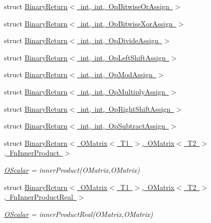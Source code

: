 \begin{DoxyCompactItemize}
\item 
struct \mbox{\hyperlink{structENSEM_1_1BinaryReturn_3_01int_00_01int_00_01OpBitwiseOrAssign_01_4}{Binary\+Return$<$ int, int, Op\+Bitwise\+Or\+Assign $>$}}
\item 
struct \mbox{\hyperlink{structENSEM_1_1BinaryReturn_3_01int_00_01int_00_01OpBitwiseXorAssign_01_4}{Binary\+Return$<$ int, int, Op\+Bitwise\+Xor\+Assign $>$}}
\item 
struct \mbox{\hyperlink{structENSEM_1_1BinaryReturn_3_01int_00_01int_00_01OpDivideAssign_01_4}{Binary\+Return$<$ int, int, Op\+Divide\+Assign $>$}}
\item 
struct \mbox{\hyperlink{structENSEM_1_1BinaryReturn_3_01int_00_01int_00_01OpLeftShiftAssign_01_4}{Binary\+Return$<$ int, int, Op\+Left\+Shift\+Assign $>$}}
\item 
struct \mbox{\hyperlink{structENSEM_1_1BinaryReturn_3_01int_00_01int_00_01OpModAssign_01_4}{Binary\+Return$<$ int, int, Op\+Mod\+Assign $>$}}
\item 
struct \mbox{\hyperlink{structENSEM_1_1BinaryReturn_3_01int_00_01int_00_01OpMultiplyAssign_01_4}{Binary\+Return$<$ int, int, Op\+Multiply\+Assign $>$}}
\item 
struct \mbox{\hyperlink{structENSEM_1_1BinaryReturn_3_01int_00_01int_00_01OpRightShiftAssign_01_4}{Binary\+Return$<$ int, int, Op\+Right\+Shift\+Assign $>$}}
\item 
struct \mbox{\hyperlink{structENSEM_1_1BinaryReturn_3_01int_00_01int_00_01OpSubtractAssign_01_4}{Binary\+Return$<$ int, int, Op\+Subtract\+Assign $>$}}
\item 
struct \mbox{\hyperlink{structENSEM_1_1BinaryReturn_3_01OMatrix_3_01T1_01_4_00_01OMatrix_3_01T2_01_4_00_01FnInnerProduct_01_4}{Binary\+Return$<$ O\+Matrix$<$ T1 $>$, O\+Matrix$<$ T2 $>$, Fn\+Inner\+Product $>$}}
\begin{DoxyCompactList}\small\item\em \mbox{\hyperlink{classENSEM_1_1OScalar}{O\+Scalar}} = inner\+Product(\+O\+Matrix,\+O\+Matrix) \end{DoxyCompactList}\item 
struct \mbox{\hyperlink{structENSEM_1_1BinaryReturn_3_01OMatrix_3_01T1_01_4_00_01OMatrix_3_01T2_01_4_00_01FnInnerProductReal_01_4}{Binary\+Return$<$ O\+Matrix$<$ T1 $>$, O\+Matrix$<$ T2 $>$, Fn\+Inner\+Product\+Real $>$}}
\begin{DoxyCompactList}\small\item\em \mbox{\hyperlink{classENSEM_1_1OScalar}{O\+Scalar}} = inner\+Product\+Real(\+O\+Matrix,\+O\+Matrix) \end{DoxyCompactList}\item 

\end{DoxyCompactItemize}
